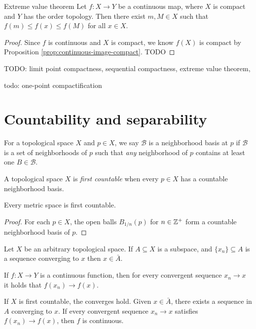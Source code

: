 \begin{thm}{Extreme value theorem}\label{thm:extreme-value}\proofbreak
    Let $f: X \to Y$ be a continuous map, where $X$ is compact and $Y$ has the order topology. Then there exist $m, M \in X$ such that $f(m) \leq f(x) \leq f(M)$ for all $x \in X$.
\end{thm}

\begin{proof}
    Since $f$ is continuous and $X$ is compact, we know $f(X)$ is compact by Proposition \ref{prop:continuous-image-compact}. {\color{red}TODO}
\end{proof}

{\color{red}TODO: limit point compactness, sequential compactness, extreme value theorem, }

{\color{red}todo: one-point compactification}

\section{Countability and separability}

\begin{defn}
    For a topological space $X$ and $p \in X$, we say $\mathcal{B}$ is a neighborhood basis at $p$ if $\mathcal{B}$ is a set of neighborhoods of $p$ such that \emph{any} neighborhood of $p$ contains at least one $B \in \mathcal{B}$.
\end{defn}

\begin{defn}
    A topological space $X$ is \emph{first countable} when every $p \in X$ has a countable neighborhood basis.
\end{defn}

\begin{prop}
    Every metric space is first countable.
\end{prop}

\begin{proof}
    For each $p \in X$, the open balls $B_{1/n}(p)$ for $n \in \mathbb{Z}^+$ form a countable neighborhood basis of $p$.
\end{proof}

\begin{thm}
    Let $X$ be an arbitrary topological space. If $A \subseteq X$ is a subspace, and $\{x_n\} \subseteq A$ is a sequence converging to $x$ then $x \in \bar{A}$.

    If $f: X \to Y$ is a continuous function, then for every convergent sequence $x_n \to x$ it holds that $f(x_n) \to f(x)$.

    If $X$ is first countable, the converges hold. Given $x \in \bar{A}$, there exists a sequence in $A$ converging to $x$. If every convergent sequence $x_n \to x$ satisfies $f(x_n) \to f(x)$, then $f$ is continuous.
\end{thm}


